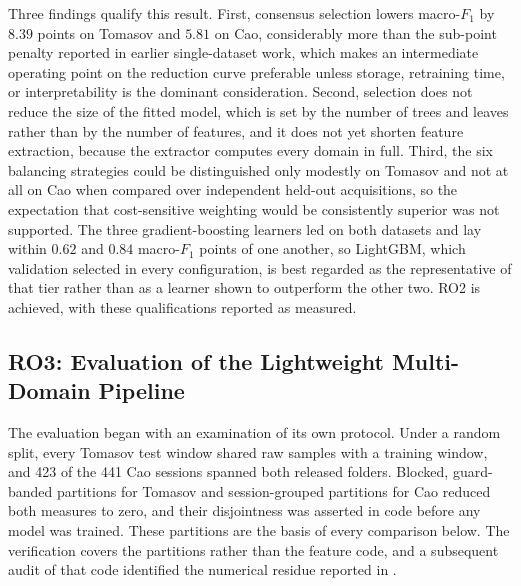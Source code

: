 Three findings qualify this result. First, consensus selection lowers macro-$F_1$ by $8.39$ points on Tomasov and $5.81$ on Cao, considerably more than the sub-point penalty reported in earlier single-dataset work, which makes an intermediate operating point on the reduction curve preferable unless storage, retraining time, or interpretability is the dominant consideration. Second, selection does not reduce the size of the fitted model, which is set by the number of trees and leaves rather than by the number of features, and it does not yet shorten feature extraction, because the extractor computes every domain in full. Third, the six balancing strategies could be distinguished only modestly on Tomasov and not at all on Cao when compared over independent held-out acquisitions, so the expectation that cost-sensitive weighting would be consistently superior was not supported. The three gradient-boosting learners led on both datasets and lay within $0.62$ and $0.84$ macro-$F_1$ points of one another, so LightGBM, which validation selected in every configuration, is best regarded as the representative of that tier rather than as a learner shown to outperform the other two. RO2 is achieved, with these qualifications reported as measured.

\subsection{RO3: Evaluation of the Lightweight Multi-Domain Pipeline}
\label{sec:chap5RO3}
The evaluation began with an examination of its own protocol. Under a random split, every Tomasov test window shared raw samples with a training window, and 423 of the 441 Cao sessions spanned both released folders. Blocked, guard-banded partitions for Tomasov and session-grouped partitions for Cao reduced both measures to zero, and their disjointness was asserted in code before any model was trained. These partitions are the basis of every comparison below. The verification covers the partitions rather than the feature code, and a subsequent audit of that code identified the numerical residue reported in .

